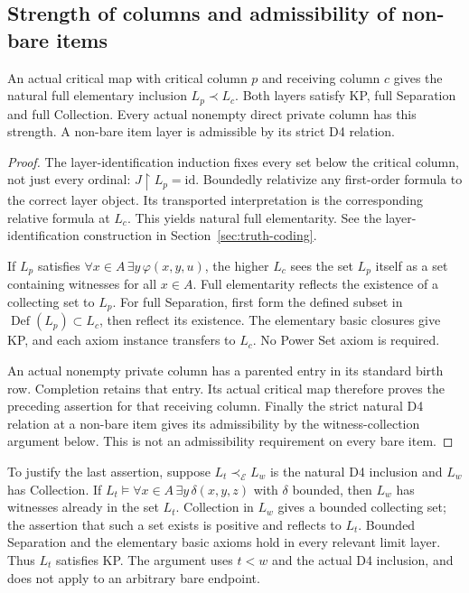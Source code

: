 \subsection{Strength of columns and admissibility of non-bare items}
\begin{lemma}\label{lem:strong-column}
An actual critical map with critical column $p$ and receiving column
$c$ gives the natural full elementary inclusion $L_p\prec L_c$.
Both layers satisfy KP, full Separation and full Collection. Every
actual nonempty direct private column has this strength. A non-bare
item layer is admissible by its strict D4 relation.
\end{lemma}
\begin{proof}
The layer-identification induction fixes every set below the critical
column, not just every ordinal: $J\restriction L_p=\mathrm{id}$.
Boundedly relativize any first-order formula to the correct layer
object. Its transported interpretation is the corresponding
relative formula at $L_c$. This yields natural full elementarity.
See the layer-identification construction in
Section~\ref{sec:truth-coding}.

If $L_p$ satisfies $\forall x\in A\,\exists y\,\varphi(x,y,u)$,
the higher $L_c$ sees the set $L_p$ itself as a set containing
witnesses for all $x\in A$. Full elementarity reflects the existence
of a collecting set to $L_p$. For full Separation, first form the
defined subset in $\operatorname{Def}(L_p)\subset L_c$, then reflect
its existence. The elementary basic closures give KP, and each
axiom instance transfers to $L_c$. No Power Set axiom is required.

An actual nonempty private column has a parented entry in its
standard birth row. Completion retains that entry. Its actual
critical map therefore proves the preceding assertion for that
receiving column. Finally the strict natural D4 relation at a
non-bare item gives its admissibility by the witness-collection argument below. This is not an admissibility requirement on
every bare item.
\end{proof}

To justify the last assertion, suppose $L_t\prec_{\mathcal E}L_w$
is the natural D4 inclusion and $L_w$ has Collection. If
$L_t\models\forall x\in A\,\exists y\,\delta(x,y,z)$ with $\delta$
bounded, then $L_w$ has witnesses already in the set $L_t$.
Collection in $L_w$ gives a bounded collecting set; the assertion that
such a set exists is positive and reflects to $L_t$. Bounded Separation
and the elementary basic axioms hold in every relevant limit layer.
Thus $L_t$ satisfies KP. The argument uses $t<w$ and the actual D4
inclusion, and does not apply to an arbitrary bare endpoint.

